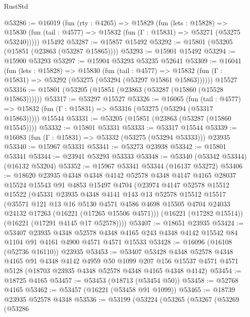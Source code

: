 \begin{lexlean}{RustStd}
\begin{coremodule}
@53286 := @16019
    (fun (rty : @4265) =>
    @15829
      (fun (lets : @15828) =>
      @15830 (fun (tail : @4577) => @15832 (fun (Γ : @15831) => @53271 (@53275 @53240)))))
    @15492
@53287 := @15857 @15492
@53292 := @15801 (@53205 (@15851 (@23863 (@53287 @15865))))
@53293 := @15901 @15492
@53294 := @15900 @53293
@53297 := @15904 @53293 @53235 @52641
@53309 := @16041
    (fun (lets : @15828) =>
    @15830
      (fun (tail : @4577) =>
      @15832 (fun (Γ : @15831) => @53292 (@53275 (@53294 (@53297 @15861 @15863))))))
    @15527
@53316 := @15801 (@53205 (@15851 (@23863 (@53287 (@15860 (@15528 @15863))))))
@53317 := @53297 @15527
@53326 := @16065
    (fun (tail : @4577) => @15832 (fun (Γ : @15831) => @53316 (@53275 (@53294 (@53317 @15863)))))
    @15544
@53331 := @53205 (@15851 (@23863 (@53287 (@15860 @15545))))
@53332 := @15801 @53331
@53333 := @53317 @15544
@53339 := @16083 (fun (Γ : @15831) => @53332 (@53275 (@53294 @53333))) @23935
@53340 := @15967 @53331
@53341 := @53273 @23938
@53342 := @15801 @53341
@53344 := @23941 @53293 @53333
@53348 := @53340 (@53342 @53344) (@16132 @53204)
@53352 := @15967 @53341 @53344 (@16137 @53272)
@53406 := @18620
    @23935
    @4348
    @4348
    @4142
    @52578
    @4348
    @4147
    @4165
    @28037
    @15524
    @15543
    @91
    @4853
    @15497
    @4704
    (@23974
      @4147
      @52578
      @15512
      @15522
      (@45331
        @23935
        @4348
        @4141
        @143
        @13
        @52578
        @15512
        @15517
        (@35571
          @121
          @13
          @16
          @5130
          @4571
          @4586
          @4698
          @15505
          @4704
          @24033
          @24132
          @17263
          (@16221 (@17265 @15506 @4571)))
        (@16221 (@17282 @15514))
        (@16221 (@17291 @4145 @17 @52578))))
@53407 := @18651 @23935
@53424 := @53407
    @23935
    @4348
    @52578
    @4348
    @4165
    @243
    @4348
    @4142
    @15542
    @84
    @1104
    @91
    @4161
    @4900
    @4571
    @4571
    @15533
@53428 := @16096 (@16108 (@52736 @16110)) @23935
@53453 := @53407
    @53428
    @4348
    @52578
    @4348
    @4165
    @91
    @4348
    @4142
    @4959
    @50
    @1099
    @207
    @156
    @15537
    @4571
    @4571
    @5128
    (@18703 @23935 @4348 @52578 @4348 @4165 @4348 @4142)
@53454 := @18725 @4165
@53457 := @53453 (@18713 (@53454 @50))
@53458 := @52768 @4165
@53462 := @53457 (@16221 (@53458 @91 @1099))
@53465 := @18739 @23935 @52578 @4348
@53536 := @53199
    (@53224
      (@53265
        (@53267
          (@53269
            (@53286

\end{coremodule}
\end{lexlean}
